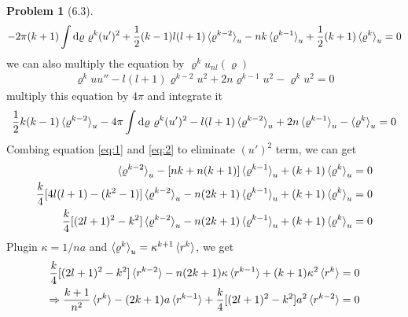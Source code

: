 \documentclass[twoside,11pt]{article}
\renewcommand*\d{\mathop{}\!\mathrm{d}}
\theoremstyle{definition}
\newtheorem{problem}{Problem}
\theoremstyle{remark}
\begin{document}
\begin{problem}[6.3]
\begin{align}
    -2\pi (k+1)\int\d\varrho\ \varrho^k (u')^2 + \frac{1}{2}(k-1)l(l+1)\braket{\varrho^{k-2}}_u
    - nk\braket{\varrho^{k-1}}_u + \frac{1}{2}(k+1)\braket{\varrho^k}_u = 0
    \label{eq:1}
\end{align}
we can also multiply the equation by $\varrho^k u_{nl}(\varrho)$
\begin{align*}
    \varrho^kuu'' - l(l+1)\varrho^{k-2}u^2 + 2n\varrho^{k-1}u^2 - \varrho^k u^2 = 0
\end{align*}
multiply this equation by $4\pi$ and integrate it
\begin{align}
    \frac{1}{2}k(k-1)\braket{\varrho^{k-2}}_u -4\pi\int\d\varrho\ \varrho^k (u')^2
    - l(l+1)\braket{\varrho^{k-2}}_u + 2n\braket{\varrho^{k-1}}_u
    - \braket{\varrho^k}_u = 0
    \label{eq:2}
\end{align}
Combing equation \ref{eq:1} and \ref{eq:2} to eliminate $(u')^2$ term, we can get
\begin{align*}
    [\frac{1}{2}(k-1)l(l+1) - \frac{1}{4}k(k^2-1)+\frac{1}{2}l(l+1)(k+1)]\braket{\varrho^{k-2}}_u 
    - [nk+n(k+1)]\braket{\varrho^{k-1}}_u + (k+1)\braket{\varrho^k}_u &= 0\\
    \frac{k}{4}[4l(l+1)-(k^2-1)]\braket{\varrho^{k-2}}_u - n(2k+1)\braket{\varrho^{k-1}}_u
    +(k+1)\braket{\varrho^k}_u &= 0\\
    \frac{k}{4}[(2l+1)^2 - k^2]\braket{\varrho^{k-2}}_u - n(2k+1)\braket{\varrho^{k-1}}_u
    + (k+1)\braket{\varrho^k}_u &= 0
\end{align*}
Plugin $\kappa = 1/na$ and $\braket{\varrho^k}_u = \kappa^{k+1}\braket{r^k}$, we get
\begin{align*}
    \frac{k}{4}[(2l+1)^2 - k^2]\braket{r^{k-2}} - n(2k+1)\kappa\braket{r^{k-1}}
    + (k+1)\kappa^2\braket{r^k} &= 0\\
    \Rightarrow \frac{k+1}{n^2}\braket{r^k} - (2k+1)a\braket{r^{k-1}} + \frac{k}{4}[(2l+1)^2 - k^2]a^2\braket{r^{k-2}}
    &= 0
\end{align*}


\end{problem}
\end{document}
